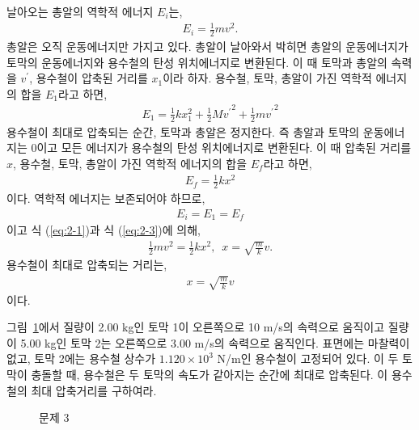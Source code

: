 \documentclass[floatfix,nofootinbib,superscriptaddress,fleqn]{revtex4-2}
\begin{document}
날아오는 총알의 역학적 에너지 $E_i$는,
\begin{align}\label{eq:2-1}
  E_i = \frac{1}{2}mv^2.
\end{align}
총알은 오직 운동에너지만 가지고 있다. 총알이 날아와서 박히면 총알의 
운동에너지가 토막의 운동에너지와 용수철의 탄성 위치에너지로 변환된다.
이 때 토막과 총알의 속력을 $v^\prime$, 용수철이 압축된 거리를 $x_1$이라 하자.
용수철, 토막, 총알이 가진 역학적 에너지의 합을 $E_1$라고 하면,
\begin{align}
E_1=\frac{1}{2}kx_1^2+\frac{1}{2}M{v^\prime}^2+\frac{1}{2}m{v^\prime}^2
\end{align}
용수철이 최대로 압축되는 순간, 토막과 총알은 정지한다. 즉 총알과 토막의
운동에너지는 0이고 모든 에너지가 용수철의 탄성 위치에너지로 변환된다. 
이 때 압축된 거리를 $x$, 용수철, 토막, 총알이 가진 역학적 에너지의 합을 
$E_f$라고 하면,
\begin{align}\label{eq:2-3}
  E_f = \frac{1}{2}kx^2
\end{align}
이다. 역학적 에너지는 보존되어야 하므로,
\begin{align}
  E_i = E_1 = E_f
\end{align}
이고 식 (\ref{eq:2-1})과 식 (\ref{eq:2-3})에 의해,
\begin{align}
  \frac{1}{2}mv^2=\frac{1}{2}kx^2,\,\,\,x=\sqrt{\frac{m}{k}}v.
\end{align}
용수철이 최대로 압축되는 거리는,
\begin{align}
  x=\sqrt{\frac{m}{k}}v
\end{align}
이다.
\vspace{1cm}

그림~\ref{fig:3}에서 질량이 2.00 kg인 토막 1이 오른쪽으로 10 m/s의
속력으로 움직이고 질량이 5.00 kg인 토막 2는 오른쪽으로 3.00 m/s의
속력으로 움직인다. 표면에는 마찰력이 없고, 토막 2에는 용수철 상수가
$1.120\times 10^3$ N/m인 용수철이 고정되어 있다. 이 두 토막이 충돌할
때, 용수철은 두 토막의 속도가 같아지는 순간에 최대로
압축된다. 이 용수철의 최대 압축거리를 구하여라. 
\begin{figure}[ht]
  \centering
  \caption{문제 3}
  \label{fig:3}
\end{figure}
\end{document}
